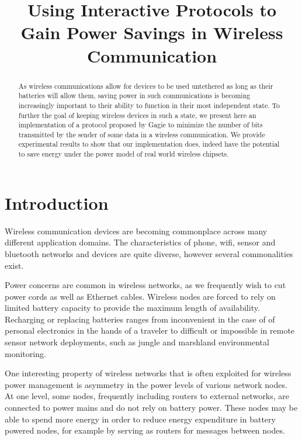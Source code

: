\documentclass[conference]{IEEEtran}
\begin{document}
\title{Using Interactive Protocols to Gain Power Savings in Wireless Communication}

\author{
}
\maketitle

\begin{abstract}
As wireless communications allow for devices to be used untethered as long
as their batteries will allow them, saving power in such communications is
becoming increasingly important to their ability to function in their most
independent state. To further the goal of keeping wireless devices in such
a state, we present here an implementation of a protocol proposed by Gagie
to minimize the number of bits transmitted by the sender of some data in a
wireless communication. We provide experimental results to show that our
implementation does, indeed have the potential to save energy under the power
model of real world wireless chipsets.
\end{abstract}

\section{Introduction}

Wireless communication devices are becoming commonplace across many
different application domains.  The characteristics of phone, wifi,
sensor and bluetooth networks and devices are quite diverse, however
several commonalities exist.

Power concerns are common in wireless networks, as we frequently wish
to cut power cords as well as Ethernet cables.  Wireless nodes are
forced to rely on limited battery capacity to provide the maximum
length of availability.  Recharging or replacing batteries ranges from
inconvenient in the case of of personal electronics in the hands of a 
traveler to difficult or impossible in remote sensor network deployments, 
such as jungle and marshland environmental monitoring.

One interesting property of wireless networks that is often exploited
for wireless power management is asymmetry in the power levels of
various network nodes.  At one level, some nodes,
frequently including routers to external networks, are connected to
power mains and do not rely on battery power.  These nodes may be able
to spend more energy in order to reduce energy expenditure in battery
powered nodes, for example by serving as routers for messages between
nodes.
\end{document}
